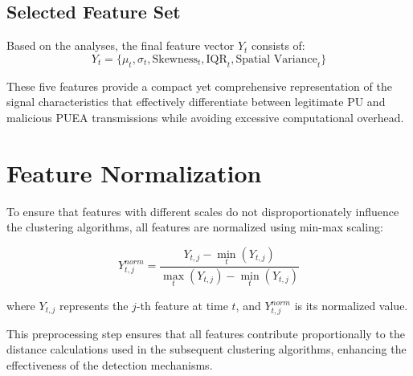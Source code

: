 \subsection{Selected Feature Set}

Based on the analyses, the final feature vector $Y_t$ consists of:
\begin{equation}
    Y_t = \{\mu_t, \sigma_t, \text{Skewness}_t, \text{IQR}_t, \text{Spatial Variance}_t\}
\end{equation}

These five features provide a compact yet comprehensive representation of the signal characteristics that effectively differentiate between legitimate PU and malicious PUEA transmissions while avoiding excessive computational overhead.

\section{Feature Normalization}

To ensure that features with different scales do not disproportionately influence the clustering algorithms, all features are normalized using min-max scaling:

\begin{equation}
    Y_{t,j}^{norm} = \frac{Y_{t,j} - \min_t(Y_{t,j})}{\max_t(Y_{t,j}) - \min_t(Y_{t,j})}
\end{equation}

where $Y_{t,j}$ represents the $j$-th feature at time $t$, and $Y_{t,j}^{norm}$ is its normalized value.

This preprocessing step ensures that all features contribute proportionally to the distance calculations used in the subsequent clustering algorithms, enhancing the effectiveness of the detection mechanisms.
